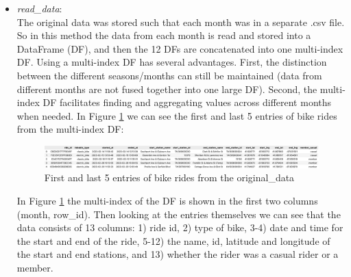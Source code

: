 \documentclass[12pt]{article}
\begin{document}
\begin{itemize}
	\item \textit{read\_data}:\\
	The original data was stored such that each month was in a separate .csv file. So in this method the data from each month is read and stored into a DataFrame (DF), and then the 12 DFs are concatenated into one multi-index DF. Using a multi-index DF has several advantages. First, the distinction between the different seasons/months can still be maintained (data from different months are not fused together into one large DF). Second, the multi-index DF facilitates finding and aggregating values across different months when needed. In Figure \ref{fig1} we can see the first and last 5 entries of bike rides from the multi-index DF:

	\begin{figure}[h]
	\hspace{0.5cm}
	\includegraphics[width=7.2 in, height = 3.3 in]{img1.png}
	\caption{First and last 5 entries of bike rides from the original\_data}
	\label{fig1}
	\end{figure}
	\pagebreak
	
	In Figure \ref{fig1} the multi-index of the DF is shown in the first two columns (month, row\_id). Then looking at the entries themselves we can see that the data consists of 13 columns: 1) ride id, 2) type of bike, 3-4) date and time for the start and end of the ride, 5-12) the name, id, latitude and longitude of the start and end stations, and 13) whether the rider was a casual rider or a member. 
	

\end{itemize}
\end{document}

